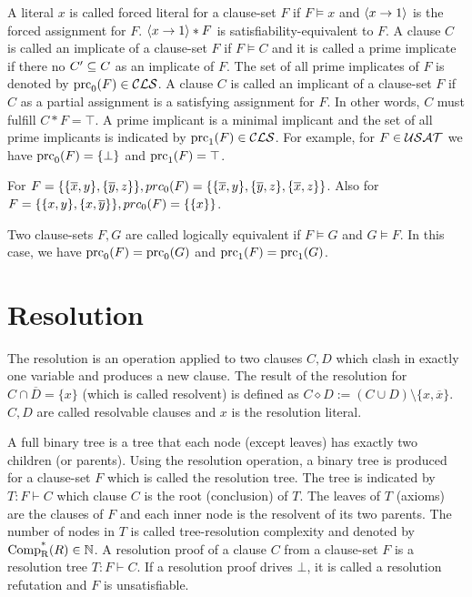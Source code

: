 \documentclass{report}
\begin{document}
A literal $x$ is called forced literal for a clause-set $F$ if $F \models x$ and $\langle x \rightarrow 1 \rangle$ is the forced assignment for $F$. $\langle x \rightarrow 1 \rangle * F$ is satisfiability-equivalent to $F$. A clause $C$ is called an implicate of a clause-set $F$ if $F \models C$ and it is called a prime implicate if there no $ C' \subseteq C$ as an implicate of $F$. The set of all prime implicates of $F$ is denoted by $\operatorname{prc}_0(F) \in \mathcal{CLS}$. A clause $C$ is called an implicant of a clause-set $F$ if $C$ as a partial assignment is a satisfying assignment for $F$. In other words, $C$ must fulfill $C * F=\top$. A prime implicant is a minimal implicant and the set of all prime implicants is indicated by $\operatorname{prc}_1(F) \in \mathcal{CLS}$. For example, for $F \in \mathcal{USAT}$ we have $\operatorname{prc}_0(F) = \{ \bot \}$ and $\operatorname{prc}_1(F) = \top$.

\begin{examp}\label{exp:bbb}
For $F = \{\{ \overline x, y\} , \{ \overline y, z\}\}, prc_0(F) = \{\{\overline x, y\} , \{\overline y, z\} , \{\overline x, z\}\}$. Also for $F = \{ \{ x, y \} , \{ x,\overline y \} \}, prc_0(F) = \{ \{ x \} \}$.
\end{examp}

Two clause-sets $F, G$ are called logically equivalent if $F \models G$ and $G \models F$. In this case, we have $\operatorname{prc}_0(F) = \operatorname{prc}_0(G)$ and $\operatorname{prc}_1(F) = \operatorname{prc}_1(G)$.

\section{Resolution}
\label{sec:Resolution}

The resolution is an operation applied to two clauses $C,D$ which clash in exactly one variable and produces a new clause. The result of the resolution for $C \cap \overline D = \{ x \}$ (which is called resolvent) is defined as $C \diamond D := (C \cup D) \setminus \{x, \overline x\} $. $C,D$ are called resolvable clauses and $x$ is the resolution literal.

A full binary tree is a tree that each node (except leaves) has exactly two children (or parents). Using the resolution operation, a binary tree is produced for a clause-set $F$ which is called the resolution tree. The tree is indicated by $T : F \vdash C$ which clause $C$ is the root (conclusion) of $T$. The leaves of $T$ (axioms) are the clauses of $F$ and each inner node is the resolvent of its two parents. The number of nodes in $T$ is called tree-resolution complexity and denoted by $\operatorname{\operatorname{Comp}_{R}^*}(R) \in \mathbb{N}$. A resolution proof of a clause $C$ from a clause-set $F$ is a resolution tree $T : F \vdash C$. If a resolution proof drives $\bot$, it is called a resolution refutation and $F$ is unsatisfiable.
\end{document}
